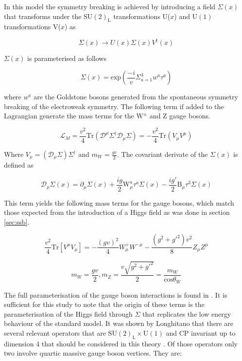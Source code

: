 In this model the symmetry breaking is achieved by introducing a field $\Sigma(x)$ that transforms under the $\text{SU}(2)_{\text{L}}$ transformations U($x$) and $\text{U}(1)$ transformations V($x$) as

\begin{equation}
\Sigma(x) \rightarrow U(x) \Sigma(x) V^{\dagger}(x)
\end{equation}

$\Sigma(x)$ is parameterised as follows

\begin{equation}
\Sigma(x) = \text{exp} (\frac{-i}{v} \Sigma^{3}_{a=1} w^{a}\tau^{a})
\end{equation}

where $w^{a}$ are the Goldstone bosons generated from the spontaneous symmetry breaking of the electroweak symmetry.  The following term if added to the Lagrangian generate the mass terms for the $\text{W}^{\pm}$ and Z gauge bosons.

\begin{equation}
\mathcal{L}_{M} = \frac{v^{2}}{4} \text{Tr} (\mathcal{D}^{\mu} \Sigma^{\dagger} \mathcal{D}_{\mu} \Sigma) = -\frac{v^{2}}{4}\text{Tr}(V_{\mu} V^{\mu})
\end{equation}

Where $V_{\mu} = (\mathcal{D}_{\mu}\Sigma) \Sigma^{\dagger}$ and $m_{W} = \frac{gv}{2}$.  The covariant derivate of the $\Sigma(x)$ is defined as

\begin{equation}
\mathcal{D}_{\mu} \Sigma(x) = \partial_{\mu} \Sigma(x) + \frac{ig}{2}\text{W}_{\mu}^{a}\tau^{a}\Sigma(x) - \frac{ig'}{2}\text{B}_{\mu}\tau^{3}\Sigma(x)
\end{equation}

This term yields the following mass terms for the gauge bosons, which match those expected from the introduction of a Higgs field as was done in section \ref{sec:ssb}.

\begin{equation}
\frac{v^{2}}{4}\text{Tr}[V^{\mu}V_{\mu}] = - \frac{(gv)^{2}}{4} W^{+}_{\mu} W^{-\mu} - \frac{(g^{2} + g'^{2})v^{2}}{8} Z_{\mu} Z^{\mu}
\end{equation}

\begin{equation}
m_{W} = \frac{gv}{2}, m_{Z} = \frac{v\sqrt{g^{2} + g'^{2}}}{2} = \frac{m_{W}}{\text{cos}{\theta_{W}}}
\end{equation}

The full parameterisation of the gauge boson interactions is found in \cite{Herrero:1994tj}.  It is sufficient for this study to note that the origin of these terms is the parameterisation of the Higgs field through $\Sigma$ that replicates the low energy behaviour of the standard model.  It was shown by Longhitano that there are several relevant operators that are $\text{SU}(2)_{\text{L}} \times \text{U}(1)$ and CP invariant up to dimension 4 that should be considered in this theory \cite{Longhitano:1980tm}.  Of those operators only two involve quartic massive gauge boson vertices.  They are:

